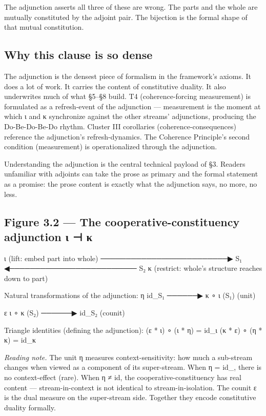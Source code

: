 \documentclass[11pt, openany]{book}
\begin{document}
The adjunction asserts all three of these are wrong. The parts and the whole are mutually constituted by the adjoint pair. The bijection is the formal shape of that mutual constitution.

\subsection{Why this clause is so dense}

The adjunction is the densest piece of formalism in the framework's axioms. It does a lot of work. It carries the content of constitutive duality. It also underwrites much of what §5–§8 build. T4 (coherence-forcing measurement) is formulated as a refresh-event of the adjunction --- measurement is the moment at which ι and κ synchronize against the other streams' adjunctions, producing the Do-Be-Do-Be-Do rhythm. Cluster III corollaries (coherence-consequences) reference the adjunction's refresh-dynamics. The Coherence Principle's second condition (measurement) is operationalized through the adjunction.

Understanding the adjunction is the central technical payload of §3. Readers unfamiliar with adjoints can take the prose as primary and the formal statement as a promise: the prose content is exactly what the adjunction says, no more, no less.

\subsection{Figure 3.2 --- The cooperative-constituency adjunction ι ⊣ κ}

\begin{Code}
        ι  (lift: embed part into whole)
      ─────────────────────────▶
  S₁ ◀─────────────────────────  S₂
        κ  (restrict: whole's structure
            reaches down to part)

  Natural transformations of the adjunction:
                η
     id_{S₁} ──────▶ κ ∘ ι (S₁)       (unit)

                ε
     ι ∘ κ (S₂) ──────▶ id_{S₂}       (counit)

  Triangle identities (defining the adjunction):
     (ε * ι) ∘ (ι * η)  = id_ι
     (κ * ε) ∘ (η * κ)  = id_κ
\end{Code}

\textit{Reading note.} The unit η measures context-sensitivity: how much a sub-stream changes when viewed as a component of its super-stream. When η = id\_, there is no context-effect (rare). When η ≠ id, the cooperative-constituency has real content --- stream-in-context is not identical to stream-in-isolation. The counit ε is the dual measure on the super-stream side. Together they encode constitutive duality formally.
\end{document}
